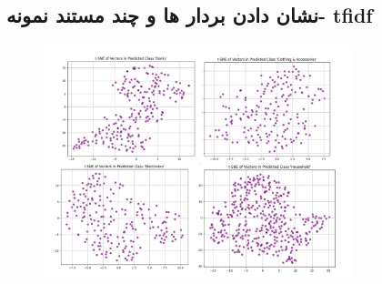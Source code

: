 \documentclass[a4paper,12pt]{article}
\begin{document}
\subsection{نشان دادن بردار ها و چند مستند نمونه- tfidf}
\begin{figure}[H]
    \centering
    \includegraphics[width=0.8\textwidth]{vectorsTfidf.png}
    \label{fig:yourlabel}
\end{figure}
\end{document}
